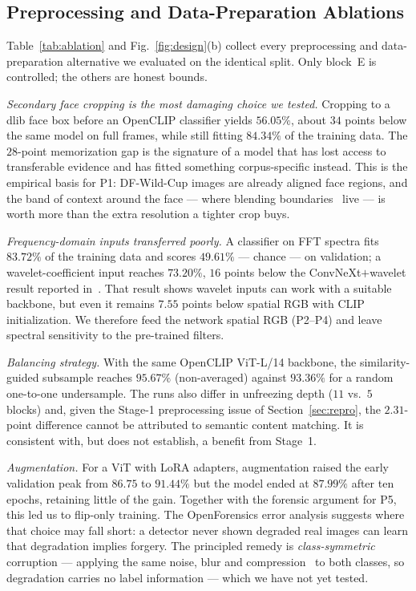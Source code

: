\documentclass[10pt,journal]{IEEEtran}
\begin{document}
\subsection{Preprocessing and Data-Preparation Ablations}\label{sec:ablation}
Table~\ref{tab:ablation} and Fig.~\ref{fig:design}(b) collect every
preprocessing and data-preparation alternative we evaluated on the identical
split. Only block~E is controlled; the others are honest bounds.

\emph{Secondary face cropping is the most damaging choice we tested.} Cropping
to a dlib face box before an OpenCLIP classifier yields $56.05\%$, about $34$
points below the same model on full frames, while still fitting $84.34\%$ of the
training data. The $28$-point memorization gap is the signature of a model
that has lost access to transferable evidence and has fitted something
corpus-specific instead. This is the empirical basis for P1: DF-Wild-Cup images
are already aligned face regions, and the band of context around the face ---
where blending boundaries~\cite{li2020facexray} live --- is worth more than the
extra resolution a tighter crop buys.

\emph{Frequency-domain inputs transferred poorly.} A classifier on FFT spectra
fits $83.72\%$ of the training data and scores $49.61\%$ --- chance --- on
validation; a wavelet-coefficient input reaches $73.20\%$, $16$ points below
the ConvNeXt$+$wavelet result reported in~\cite{bhattacharjee2026caenet}. That
result shows wavelet inputs can work with a suitable backbone, but even it
remains $7.55$ points below spatial RGB with CLIP initialization. We therefore
feed the network spatial RGB (P2--P4) and leave spectral sensitivity to the
pre-trained filters.

\emph{Balancing strategy.} With the same OpenCLIP ViT-L/14 backbone, the
similarity-guided subsample reaches $95.67\%$ (non-averaged) against $93.36\%$
for a random one-to-one undersample. The runs also differ in unfreezing depth
($11$ vs.\ $5$ blocks) and, given the Stage-1 preprocessing issue of
Section~\ref{sec:repro}, the $2.31$-point difference cannot be attributed to
semantic content matching. It is consistent with, but does not establish, a
benefit from Stage~1.

\emph{Augmentation.} For a ViT with LoRA adapters, augmentation raised the
early validation peak from $86.75$ to $91.44\%$ but the model ended at
$87.99\%$ after ten epochs, retaining little of the gain. Together with the
forensic argument for P5, this led us to flip-only training. The OpenForensics
error analysis suggests where that choice may fall short: a detector never shown
degraded real images can learn that degradation implies forgery. The principled
remedy is \emph{class-symmetric} corruption --- applying the same
noise, blur and compression~\cite{hendrycks2019corruptions} to both classes, so
degradation carries no label information --- which we have not yet tested.
\end{document}
